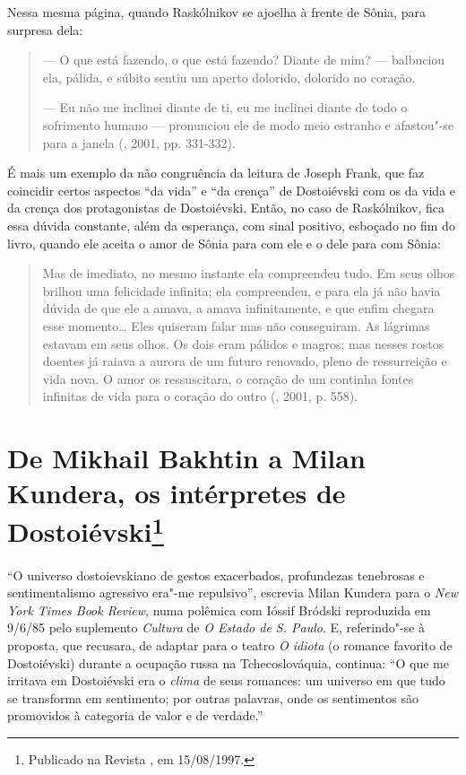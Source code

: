 Nessa mesma página, quando Raskólnikov se ajoelha à frente de Sônia,
para surpresa dela:

\begin{quotation}
--- O que está fazendo, o que está fazendo? Diante de mim? --- balbuciou
ela, pálida, e súbito sentiu um aperto dolorido, dolorido no coração.

--- Eu não me inclinei diante de ti, eu me inclinei diante de todo o
sofrimento humano --- pronunciou ele de modo meio estranho e afastou"-se
para a janela (, 2001, pp. 331-332).
\end{quotation}

É mais um exemplo da não congruência da leitura de Joseph Frank, que faz
coincidir certos aspectos ``da vida'' e ``da crença'' de Dostoiévski com
os da vida e da crença dos protagonistas de Dostoiévski. Então, no caso
de Raskólnikov, fica essa dúvida constante, além da esperança, com sinal
positivo, esboçado no fim do livro, quando ele aceita o amor de Sônia
para com ele e o dele para com Sônia:

\begin{quotation}
Mas de imediato, no mesmo instante ela compreendeu tudo. Em seus olhos
brilhou uma felicidade infinita; ela compreendeu, e para ela já não
havia dúvida de que ele a amava, a amava infinitamente, e que enfim
chegara esse momento\ldots{} Eles quiseram falar mas não conseguiram. As
lágrimas estavam em seus olhos. Os dois eram pálidos e magros; mas
nesses rostos doentes já raiava a aurora de um futuro renovado, pleno de
ressurreição e vida nova. O amor os ressuscitara, o coração de um
continha fontes infinitas de vida para o coração do outro (, 2001, p. 558).
\end{quotation}

\chapter{De Mikhail Bakhtin a Milan Kundera, os intérpretes de
Dostoiévski\footnote{Publicado na Revista \protect{}, em 15/08/1997.}}
\label{kundera}

``O universo dostoievskiano de gestos exacerbados, profundezas
tenebrosas e sentimen­talismo agressivo era"-me repulsivo'', escrevia
Milan Kundera para o \emph{New York Times Book Review}, numa polêmica
com Ióssif Bródski reproduzida em 9/6/85 pelo suplemento \emph{Cultura}
de \emph{O Estado de S. Paulo}. E, referindo"-se à proposta, que
recusara, de adaptar para o teatro \emph{O idiota} (o romance favorito
de Dostoiévski) durante a ocupação russa na Tchecoslováquia, continua:
``O que me irritava em Dostoiévski era o \emph{clima} de seus romances:
um universo em que tudo se transforma em sentimento; por outras
palavras, onde os sentimentos são promovidos à categoria de valor e de
verdade.''

